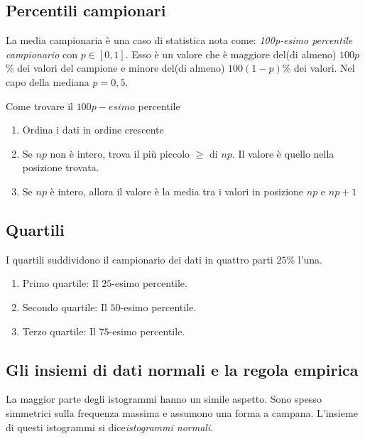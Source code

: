 \documentclass{article}
\begin{document}
\subsection*{Percentili campionari}

La media campionaria è una caso di statistica nota come: \textit{100p-esimo percentile campionario} con $p \in [0,1]$. Esso è un valore che è maggiore del(di almeno) $100p$\% dei valori del campione e minore del(di almeno) $100(1-p)\%$ dei valori. Nel capo della mediana $p=0,5$.

\begin{tcolorbox}
Come trovare il $100p-esimo$ percentile
  \begin{enumerate}
    \item Ordina i dati in ordine crescente
    \item Se $np$ non è intero, trova il più piccolo $\ge$ di $np$. Il valore è quello nella posizione trovata.
    \item Se $np$ è intero, allora il valore è la media tra i valori in posizione $np$ e $np+1$
  \end{enumerate}  
\end{tcolorbox}

\subsection*{Quartili}

I quartili suddividono il campionario dei dati in quattro parti $25\%$ l'una.

\begin{enumerate}
  \item Primo quartile: Il $25$-esimo percentile.
  \item Secondo quartile: Il $50$-esimo percentile.
  \item Terzo quartile: Il $75$-esimo percentile.
\end{enumerate}

\subsection*{Gli insiemi di dati normali e la regola empirica}

La maggior parte degli istogrammi hanno un simile aspetto. Sono spesso simmetrici sulla frequenza massima e assumono una forma a campana. L'insieme di questi istogrammi si dice\textit{istogrammi normali}.  
\end{document}
